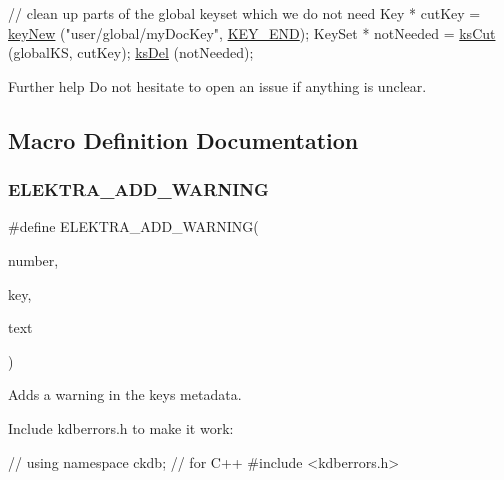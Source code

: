 \begin{DoxyCodeInclude}
        \textcolor{comment}{// clean up parts of the global keyset which we do not need}
        Key * cutKey = \hyperlink{group__key_gad23c65b44bf48d773759e1f9a4d43b89}{keyNew} (\textcolor{stringliteral}{"user/global/myDocKey"}, \hyperlink{group__key_gga91fb3178848bd682000958089abbaf40aa8adb6fcb92dec58fb19410eacfdd403}{KEY\_END});
        KeySet * notNeeded = \hyperlink{group__keyset_ga6b00cf82b59af4d883a9bad6cf4a4a4a}{ksCut} (globalKS, cutKey);
        \hyperlink{group__keyset_ga27e5c16473b02a422238c8d970db7ac8}{ksDel} (notNeeded);
\end{DoxyCodeInclude}
 \begin{DoxyParagraph}{Further help}
Do not hesitate to open an issue if anything is unclear. 
\end{DoxyParagraph}


\subsection{Macro Definition Documentation}
\mbox{\label{group__plugin_ga3da3bdb0f41710adda9eee3d7adac9ff}} 
\subsubsection{\texorpdfstring{E\+L\+E\+K\+T\+R\+A\+\_\+\+A\+D\+D\+\_\+\+W\+A\+R\+N\+I\+NG}{ELEKTRA\_ADD\_WARNING}}
{\footnotesize\ttfamily \#define E\+L\+E\+K\+T\+R\+A\+\_\+\+A\+D\+D\+\_\+\+W\+A\+R\+N\+I\+NG(\begin{DoxyParamCaption}\item[{}]{number,  }\item[{}]{key,  }\item[{}]{text }\end{DoxyParamCaption})}



Adds a warning in the keys metadata. 

Include kdberrors.\+h to make it work\+:


\begin{DoxyCodeInclude}
\textcolor{comment}{// using namespace ckdb; // for C++}
\textcolor{preprocessor}{#include <kdberrors.h>}
\end{DoxyCodeInclude}



